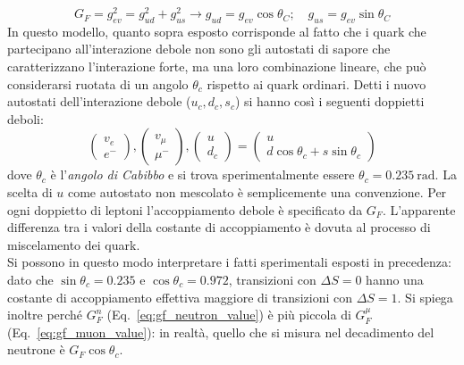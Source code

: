 \documentclass{subnucbo}
\begin{document}
\begin{equation}
        G _ { F } = g _ { e v } ^ { 2 } = g _ { u d } ^ { 2 } + g _ { u s } ^ { 2 } \longrightarrow g _ { u d } = g _ { e v } \cos \theta _ { C } ; \quad g _ { u s } = g _ { e v } \sin \theta _ { C }
\end{equation}
In questo modello, quanto sopra esposto corrisponde al fatto che i quark che partecipano all'interazione debole non sono gli autostati di sapore che caratterizzano l'interazione forte, ma una loro combinazione lineare, che può considerarsi ruotata di un angolo $\theta_{c}$ rispetto ai quark ordinari. Detti i nuovo autostati dell'interazione debole ($u_{c}, d_{c}, s_{c}$) si hanno così i seguenti doppietti deboli:
\begin{equation}
        \left( \begin{array} { c } { v _ { e } } \\ { e ^ { - } } \end{array} \right) , \left( \begin{array} { c } { v _ { \mu } } \\ { \mu ^ { - } } \end{array} \right) , \left( \begin{array} { c } { u } \\ { d _ { c } } \end{array} \right) = \left( \begin{array} { c } { u } \\ { d \cos \theta _ { c } + s \sin \theta _ { c } } \end{array} \right)
        \label{eq:weak_doublets}
\end{equation}
dove $\theta_{c}$ è l'\textit{angolo di Cabibbo} e si trova sperimentalmente essere $\theta _ { c } = 0.235\: \mathrm { rad }$. La scelta di $u$ come autostato non mescolato è semplicemente una convenzione. Per ogni doppietto di leptoni l'accoppiamento debole è specificato da $G_{F}$. L'apparente differenza tra i valori della costante di accoppiamento è dovuta al processo di miscelamento dei quark. \\
Si possono in questo modo interpretare i fatti sperimentali esposti in precedenza: dato che $\sin\theta_{c}=0.235$ e $\cos\theta_{c}=0.972$, transizioni con $\Delta S = 0$ hanno una costante di accoppiamento effettiva maggiore di transizioni con $\Delta S = 1$. Si spiega inoltre perché $G_{F}^{n}$ (Eq.~\ref{eq:gf_neutron_value}) è più piccola di $G_{F}^{\mu}$ (Eq.~\ref{eq:gf_muon_value}): in realtà, quello che si misura nel decadimento del neutrone è $G_{F}\cos \theta_{c}$.
\end{document}
